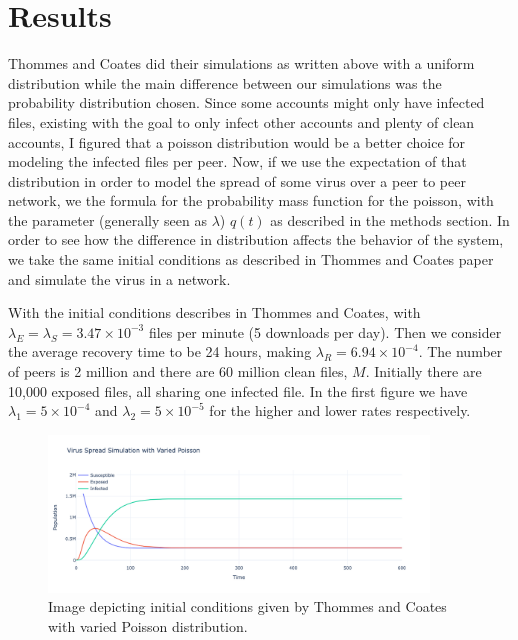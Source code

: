 \documentclass[12pt, oneside]{article}
\begin{document}
    \section{Results}
        Thommes and Coates did their simulations as written above with a uniform distribution while the main difference between our simulations was the probability distribution chosen.
        Since some accounts might only have infected files, existing with the goal to only infect other accounts and plenty of clean accounts, I figured that a poisson distribution
        would be a better choice for modeling the infected files per peer. Now, if we use the expectation of that distribution in order to model the spread of some 
        virus over a peer to peer network, we the formula for the probability mass function for the poisson, with the parameter (generally seen as $\lambda$) $q(t)$ as described in the 
        methods section. In order to see how the difference in distribution affects the behavior of the system, we take the same initial conditions as described in Thommes and Coates paper
        and simulate the virus in a network.\newline

        With the initial conditions describes in Thommes and Coates, with $\lambda_E = \lambda_S=3.47\times 10^{-3}$ files per minute (5 downloads per day). Then we consider the average recovery
        time to be 24 hours, making $\lambda_R=6.94\times 10^{-4}$. The number of peers is 2 million and there are 60 million clean files, $M$. Initially there are 10,000 exposed files, all sharing one
        infected file. In the first figure we have $\lambda_1=5\times 10^{-4}$ and $\lambda_2=5\times 10^{-5}$ for the higher and lower rates respectively.
        \begin{figure}[htbp]
            \centering
            \includegraphics[width=0.9\textwidth]{2MPoisson.png}
            \caption{Image depicting initial conditions given by Thommes and Coates with varied Poisson distribution.}
        \end{figure}
\end{document}
